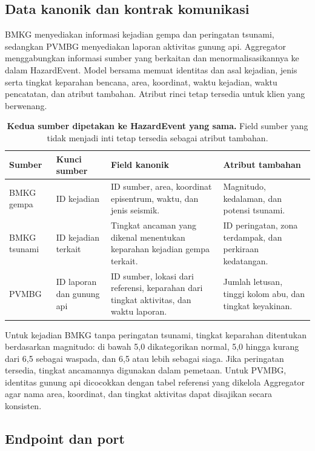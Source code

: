 \documentclass{fairmeta}
\begin{document}
\subsection{Data kanonik dan kontrak komunikasi}

BMKG menyediakan informasi kejadian gempa dan peringatan tsunami, sedangkan PVMBG menyediakan laporan aktivitas gunung api. Aggregator menggabungkan informasi sumber yang berkaitan dan menormalisasikannya ke dalam HazardEvent. Model bersama memuat identitas dan asal kejadian, jenis serta tingkat keparahan bencana, area, koordinat, waktu kejadian, waktu pencatatan, dan atribut tambahan. Atribut rinci tetap tersedia untuk klien yang berwenang.

\begin{table}[htbp]
\centering
\caption{\textbf{Kedua sumber dipetakan ke HazardEvent yang sama.} Field sumber yang tidak menjadi inti tetap tersedia sebagai atribut tambahan.}
\label{tab:mapping}
\footnotesize
\begin{tabularx}{\textwidth}{@{}L{1.25cm}L{3.2cm}YY@{}}
\toprule
\textbf{Sumber} & \textbf{Kunci sumber} & \textbf{Field kanonik} & \textbf{Atribut tambahan}\\
\midrule
BMKG gempa & ID kejadian & ID sumber, area, koordinat episentrum, waktu, dan jenis seismik. & Magnitudo, kedalaman, dan potensi tsunami.\\
\addlinespace[2pt]
BMKG tsunami & ID kejadian terkait & Tingkat ancaman yang dikenal menentukan keparahan kejadian gempa terkait. & ID peringatan, zona terdampak, dan perkiraan kedatangan.\\
\addlinespace[2pt]
PVMBG & ID laporan dan gunung api & ID sumber, lokasi dari referensi, keparahan dari tingkat aktivitas, dan waktu laporan. & Jumlah letusan, tinggi kolom abu, dan tingkat keyakinan.\\
\bottomrule
\end{tabularx}
\end{table}

Untuk kejadian BMKG tanpa peringatan tsunami, tingkat keparahan ditentukan berdasarkan magnitudo: di bawah 5,0 dikategorikan normal, 5,0 hingga kurang dari 6,5 sebagai waspada, dan 6,5 atau lebih sebagai siaga. Jika peringatan tersedia, tingkat ancamannya digunakan dalam pemetaan. Untuk PVMBG, identitas gunung api dicocokkan dengan tabel referensi yang dikelola Aggregator agar nama area, koordinat, dan tingkat aktivitas dapat disajikan secara konsisten.

\subsection{Endpoint dan port}
\end{document}
